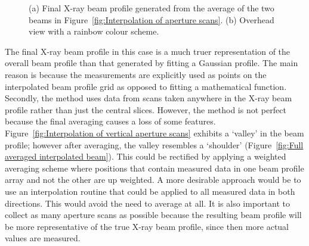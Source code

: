 \begin{figure}
\begin{subfigure}[b]{0.75\textwidth}
            \caption{}
            \label{fig:Overhead averaged interpolated interpolated beam}
    \end{subfigure}
    \caption[Final averaged X-ray beam profile used for the SAXS experiments.]{(a) Final X-ray beam profile generated from the average of the two beams in Figure~\ref{fig:Interpolation of aperture scans}.
    (b) Overhead view with a rainbow colour scheme.}
    \label{fig:Averaged Beam Profile}
\end{figure}

The final X-ray beam profile in this case is a much truer representation of the overall beam profile than that generated by fitting a Gaussian profile.
The main reason is because the measurements are explicitly used as points on the interpolated beam profile grid as opposed to fitting a mathematical function.
Secondly, the method uses data from scans taken anywhere in the X-ray beam profile rather than just the central slices.
However, the method is not perfect because the final averaging causes a loss of some features.
Figure~\ref{fig:Interpolation of vertical aperture scans} exhibits a `valley' in the beam profile; however after averaging, the valley resembles a `shoulder' (Figure~\ref{fig:Full averaged interpolated beam}).
This could be rectified by applying a weighted averaging scheme where positions that contain measured data in one beam profile array and not the other are up weighted.
A more desirable approach would be to use an interpolation routine that could be applied to all measured data in both directions.
This would avoid the need to average at all.
It is also important to collect as many aperture scans as possible because the resulting beam profile will be more representative of the true X-ray beam profile, since then more actual values are measured.

